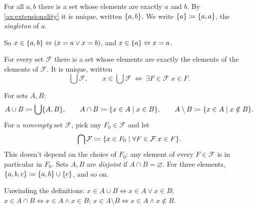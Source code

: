 \begin{axiom}[Pairing]
\label{ax:pairing}
For all $a, b$ there is a set whose elements are exactly $a$ and $b$. By
\cref{ax:extensionality} it is unique, written $\lbrace a, b \rbrace$. We write $\lbrace a \rbrace
\coloneqq \lbrace a, a \rbrace$, the \emph{singleton} of $a$.
\end{axiom}

So $x \in \lbrace a, b \rbrace \Leftrightarrow (x = a \lor x = b)$, and $x \in \lbrace a \rbrace
\Leftrightarrow x = a$.

\begin{axiom}[Union]
\label{ax:union}
For every set $\mathcal{F}$ there is a set whose elements are exactly the elements
of the elements of $\mathcal{F}$. It is unique, written
\[
  \bigcup \mathcal{F}, \qquad x \in \bigcup \mathcal{F} \;\Leftrightarrow\;
  \exists F \in \mathcal{F}\; x \in F.
\]
\end{axiom}

\begin{definition}
\label{def:set-operations}
For sets $A, B$:
\[
  A \cup B \coloneqq \bigcup \lbrace A, B \rbrace, \qquad
  A \cap B \coloneqq \lbrace x \in A \mid x \in B \rbrace, \qquad
  A \setminus B \coloneqq \lbrace x \in A \mid x \notin B \rbrace.
\]
For a \emph{nonempty} set $\mathcal{F}$, pick any $F_0 \in \mathcal{F}$ and let
\[
  \bigcap \mathcal{F} \coloneqq \lbrace x \in F_0 \mid \forall F \in \mathcal{F}\; x
  \in F \rbrace.
\]
This doesn't depend on the choice of $F_0$: any element of every $F \in
\mathcal{F}$ is in particular in $F_0$. Sets $A, B$ are \emph{disjoint} if $A
\cap B = \varnothing$. For three elements, $\lbrace a, b, c \rbrace \coloneqq \lbrace a, b \rbrace
\cup \lbrace c \rbrace$, and so on.
\end{definition}

Unwinding the definitions:
$x \in A \cup B \Leftrightarrow x \in A \lor x \in B$;
$x \in A \cap B \Leftrightarrow x \in A \land x \in B$;
$x \in A \setminus B \Leftrightarrow x \in A \land x \notin B$.

